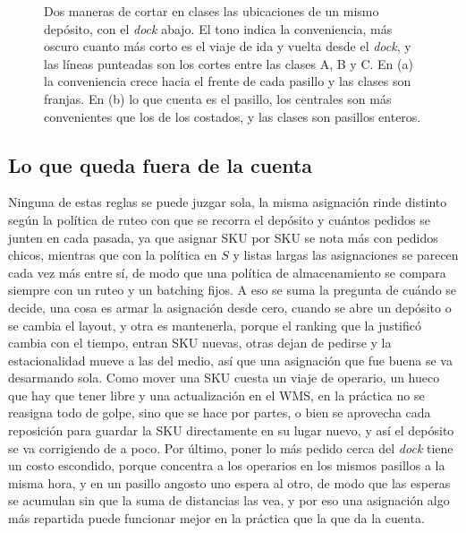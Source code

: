 \begin{figure}[ht]
    \vspace{0.6em}
    \caption{Dos maneras de cortar en clases las ubicaciones de un mismo depósito, con el \emph{dock} abajo. El tono indica la conveniencia, más oscuro cuanto más corto es el viaje de ida y vuelta desde el \emph{dock}, y las líneas punteadas son los cortes entre las clases A, B y C. En (a) la conveniencia crece hacia el frente de cada pasillo y las clases son franjas. En (b) lo que cuenta es el pasillo, los centrales son más convenientes que los de los costados, y las clases son pasillos enteros.}
    \label{fig:zonas-abc}
\end{figure}

\subsection{Lo que queda fuera de la cuenta}

Ninguna de estas reglas se puede juzgar sola, la misma asignación rinde distinto según la política de ruteo con que se recorra el depósito y cuántos pedidos se junten en cada pasada, ya que asignar SKU por SKU se nota más con pedidos chicos, mientras que con la política en $S$ y listas largas las asignaciones se parecen cada vez más entre sí, de modo que una política de almacenamiento se compara siempre con un ruteo y un batching fijos.
A eso se suma la pregunta de cuándo se decide, una cosa es armar la asignación desde cero, cuando se abre un depósito o se cambia el layout, y otra es mantenerla, porque el ranking que la justificó cambia con el tiempo, entran SKU nuevas, otras dejan de pedirse y la estacionalidad mueve a las del medio, así que una asignación que fue buena se va desarmando sola.
Como mover una SKU cuesta un viaje de operario, un hueco que hay que tener libre y una actualización en el WMS, en la práctica no se reasigna todo de golpe, sino que se hace por partes, o bien se aprovecha cada reposición para guardar la SKU directamente en su lugar nuevo, y así el depósito se va corrigiendo de a poco.
Por último, poner lo más pedido cerca del \emph{dock} tiene un costo escondido, porque concentra a los operarios en los mismos pasillos a la misma hora, y en un pasillo angosto uno espera al otro, de modo que las esperas se acumulan sin que la suma de distancias las vea, y por eso una asignación algo más repartida puede funcionar mejor en la práctica que la que da la cuenta.

